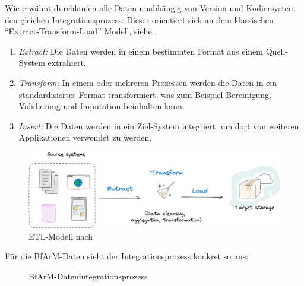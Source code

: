 Wie erwähnt durchlaufen alle Daten unabhängig von Version und Kodiersystem den gleichen Integrationsprozess. Dieser orientiert sich an dem klassischen ``Extract-Transform-Load'' Modell, siehe \citep[Seite 247ff]{bonnefoy2024definitive}.

\begin{enumerate}
\item \emph{Extract:} Die Daten werden in einem bestimmten Format aus einem Quell-System extrahiert. 
\item \emph{Transform:} In einem oder mehreren Prozessen werden die Daten in ein standardisiertes Format transformiert, was zum Beispiel Bereinigung, Validierung und Imputation beinhalten kann.
\item \emph{Insert:} Die Daten werden in ein Ziel-System integriert, um dort von weiteren Applikationen verwendet zu werden. 
\end{enumerate}

\vspace{10pt}

\begin{figure}[H]
    \centering
    \includegraphics[width=\linewidth]{../img/etl.jpg}
    \caption{ETL-Modell nach \citep[Seite 63]{bonnefoy2024definitive}}
\end{figure}

Für die BfArM-Daten sieht der Integrationsprozess konkret so aus:

\begin{figure}[H]
    \centering
    \resizebox{.9\textwidth}{!}{}
    \caption{BfArM-Datenintegrationsprozess}
\end{figure}

